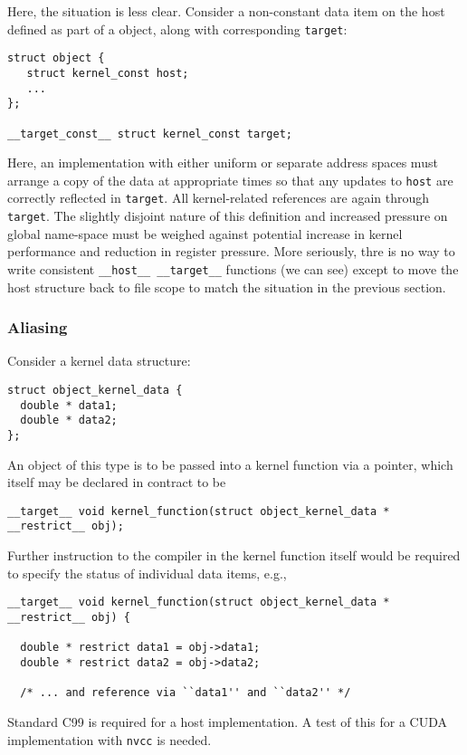 Here, the situation is less clear. Consider a non-constant data item
on the host defined as part of a object, along with corresponding
\texttt{target}:
\begin{lstlisting}
struct object {
   struct kernel_const host;
   ...
};

__target_const__ struct kernel_const target;

\end{lstlisting}
Here, an implementation with either uniform or separate address
spaces must arrange a copy of the data at appropriate times so
that any updates to \texttt{host} are correctly reflected
in \texttt{target}. All kernel-related references are again through
\texttt{target}.
The slightly disjoint nature of this definition and increased pressure
on global name-space must be weighed against potential increase in kernel
performance and reduction in register pressure. More seriously, thre is
no way to write consistent \texttt{\_\_host\_\_ \_\_target\_\_} functions
(we can see) except to move the host structure back to file scope to
match the situation in the previous section.

\subsubsection{Aliasing}
Consider a kernel data structure:
\begin{lstlisting}
struct object_kernel_data {
  double * data1;
  double * data2;
};
\end{lstlisting}
An object of this type is to be passed into a kernel function via a pointer,
which itself may be declared in contract to be
\begin{lstlisting}
__target__ void kernel_function(struct object_kernel_data * __restrict__ obj);
\end{lstlisting}
Further instruction to the compiler in the kernel function itself would
be required to specify the status of individual data items, e.g.,
\begin{lstlisting}
__target__ void kernel_function(struct object_kernel_data * __restrict__ obj) {

  double * restrict data1 = obj->data1;
  double * restrict data2 = obj->data2;

  /* ... and reference via ``data1'' and ``data2'' */
\end{lstlisting}
Standard C99 is required for a host implementation.
A test of this for a CUDA implementation with \texttt{nvcc} is needed.


